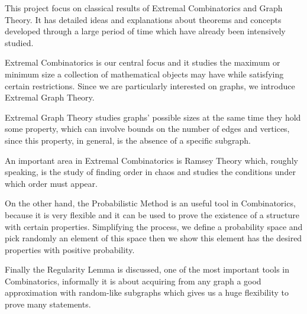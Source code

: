 \documentclass[12pt,twoside,a4paper,bibliography=totocnumbered]{book}
\numberwithin{equation}{section}
\theoremstyle{remark}
\begin{document}
This project focus on classical results of Extremal Combinatorics and Graph Theory. It has detailed ideas and explanations about theorems and concepts developed through a large period of time which have already been intensively studied.

Extremal Combinatorics is our central focus and it studies the maximum or minimum size a collection of mathematical objects may have while satisfying certain restrictions. Since we are particularly interested on graphs, we introduce Extremal Graph Theory. 

Extremal Graph Theory studies graphs' possible sizes at the same time they hold some property, which can involve bounds on the number of edges and vertices, since this property, in general, is the absence of a specific subgraph.

An important area in Extremal Combinatorics is Ramsey Theory which, roughly speaking, is the study of finding order in chaos and studies the conditions under which order must appear.

On the other hand, the Probabilistic Method is an useful tool in Combinatorics, because it is very flexible and it can be used to prove the existence of a structure with certain properties. Simplifying the process, we define a probability space and pick randomly an element of this space then we show this element has the desired properties with positive probability.

Finally the Regularity Lemma is discussed, one of the most important tools in Combinatorics, informally it is about acquiring from any graph a good approximation with random-like subgraphs which gives us a huge flexibility to prove many statements.






\end{document}
